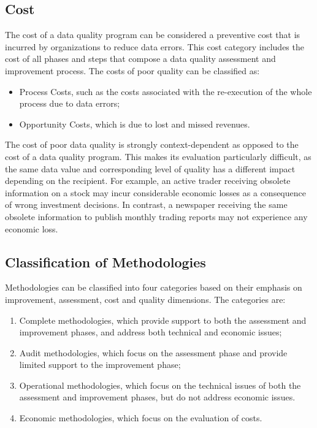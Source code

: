 \documentclass[pdftex,english,oribibl]{llncs}
\begin{document}
\subsection{Cost}
The cost of a data quality program can be considered a preventive cost that is incurred by organizations to reduce data errors. This cost category includes the cost of all phases and steps that compose a data quality assessment and improvement process.
 The costs of poor quality can be classified as:
\begin{itemize}
    \item Process Costs, such as the costs associated with the re-execution of the whole process due to data errors;
    \item Opportunity Costs, which is due to lost and missed revenues.
\end{itemize}
 The cost of poor data quality is strongly context-dependent as opposed to the cost of a data quality program. This makes its evaluation particularly difficult, as the same data value and corresponding level of quality has a different impact depending on the recipient. For example, an active trader receiving obsolete information on a stock may incur considerable economic losses as a consequence of wrong investment decisions. In contrast, a newspaper receiving the same obsolete information to publish monthly trading reports may not experience any economic loss.

\subsection{Classification of Methodologies}
Methodologies can be classified into four categories based on their emphasis on improvement, assessment, cost and quality dimensions. \cite{Batini2009MethodologiesForDataQuality}  The categories are:
\begin{enumerate}
    \item Complete methodologies, which provide support to both the assessment and improvement phases, and address both technical and economic issues;
    \item Audit methodologies, which focus on the assessment phase and provide limited support to the improvement phase;
    \item Operational methodologies, which focus on the technical issues of both the assessment and improvement phases, but do not address economic issues.
    \item Economic methodologies, which focus on the evaluation of costs.
\end{enumerate}
\end{document}
